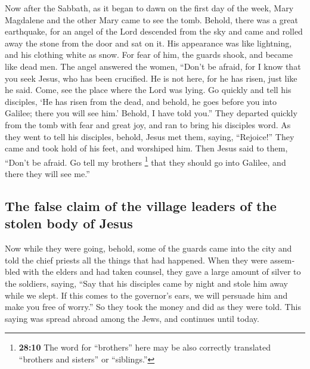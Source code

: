 \begin{paracol}{2}
\begin{otherlanguage}{english}
 Now after the Sabbath, as it began to dawn on the first
day of the week, Mary Magdalene and the other Mary came to see the tomb.
 Behold, there was a great earthquake, for an angel of the
Lord descended from the sky and came and rolled away the stone from the
door and sat on it.  His appearance was like lightning,
and his clothing white as snow.  For fear of him, the
guards shook, and became like dead men.  The angel
answered the women, ``Don't be afraid, for I know that you seek Jesus,
who has been crucified.  He is not here, for he has risen,
just like he said. Come, see the place where the Lord was lying.
 Go quickly and tell his disciples, `He has risen from the
dead, and behold, he goes before you into Galilee; there you will see
him.' Behold, I have told you.''  They departed quickly
from the tomb with fear and great joy, and ran to bring his disciples
word.  As they went to tell his disciples, behold, Jesus
met them, saying, ``Rejoice!'' They came and took hold of his feet, and
worshiped him.  Then Jesus said to them, ``Don't be
afraid. Go tell my brothers \footnote{\textbf{28:10} The word for
  ``brothers'' here may be also correctly translated ``brothers and
  sisters'' or ``siblings.''} that they should go into Galilee, and
there they will see me.''

\hypertarget{the-false-claim-of-the-village-leaders-of-the-stolen-body-of-jesus}{%
\subsection{The false claim of the village leaders of the stolen body of
Jesus}\label{the-false-claim-of-the-village-leaders-of-the-stolen-body-of-jesus}}

 Now while they were going, behold, some of the guards
came into the city and told the chief priests all the things that had
happened.  When they were assembled with the elders and
had taken counsel, they gave a large amount of silver to the soldiers,
 saying, ``Say that his disciples came by night and stole
him away while we slept.  If this comes to the governor's
ears, we will persuade him and make you free of worry.'' 
So they took the money and did as they were told. This saying was spread
abroad among the Jews, and continues until today.

\hypertarget{jesus-appeared-on-the-mountain-of-galilee-his-last-command-to-the-eleven-disciples}{%
}
\end{otherlanguage}
\end{paracol}
